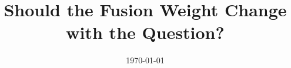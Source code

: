 \usepackage{amsmath,amssymb}
\usepackage{booktabs}
\usepackage{xcolor}
\graphicspath{{assets/}{../figs/}}

\newcommand{\lam}{\lambda}
\newcommand{\strong}[1]{\textcolor{mbzuai-navy}{\textbf{#1}}}
\newcommand{\good}[1]{\textcolor{green!45!black}{\textbf{#1}}}
\newcommand{\bad}[1]{\textcolor{red!65!black}{\textbf{#1}}}

\newcommand{\roleJH}{Problem and setup; score cache and data pipeline; Q1 analysis; overall study (Q1--Q4)}
\newcommand{\roleLJ}{Continual learning experiments and analysis (Q2--Q3)}
\newcommand{\roleMA}{Downstream question-answering evaluation (Q4)}

\title[Fusion Weight for Keyframe Search]{Should the Fusion Weight Change with the Question?}
\date{\today}
\footright{\insertframenumber{} / \inserttotalframenumber}

\usepackage{etoolbox}
\newcommand{\teamrow}[4]{%
  \ifstrequal{#1}{#2}%
    {\textbf{\textcolor{mbzuai-navy}{#3}} & \textbf{\textcolor{mbzuai-navy}{#4}} & \textcolor{mbzuai-dark-sand}{\textbf{this talk}}}%
    {\textcolor{mbzuai-subtle}{#3} & \textcolor{mbzuai-subtle}{#4} & }}
\newcommand{\teamframe}[1]{%
\begin{frame}{Team and my part}
  \centering
  \renewcommand{\arraystretch}{1.6}
  \begin{tabular}{p{0.27\textwidth}p{0.52\textwidth}p{0.11\textwidth}}
    \toprule
    Member & Main contribution & \\
    \midrule
    \teamrow{JH}{#1}{Jianxiang He}{\roleJH} \\
    \teamrow{LJ}{#1}{Longtao Jiang}{\roleLJ} \\
    \teamrow{MA}{#1}{Makhmud Assentay}{\roleMA} \\
    \bottomrule
  \end{tabular}
\end{frame}}

